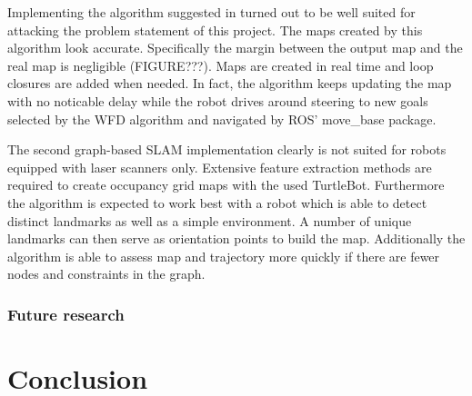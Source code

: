 \documentclass{ba-kecs}
\begin{document}
Implementing the algorithm suggested in \citep{Grisetti} turned out to be well suited for attacking the problem statement of this project. The maps created by this algorithm look accurate. Specifically the margin between the output map and the real map is negligible (FIGURE???). Maps are created in real time and loop closures are added when needed. In fact, the algorithm keeps updating the map with no noticable delay while the robot drives around steering to new goals selected by the WFD algorithm and navigated by ROS' move\_base package.

The second graph-based SLAM implementation \cite{Thrun} clearly is not suited for robots equipped with laser scanners only. Extensive feature extraction methods are required to create occupancy grid maps with the used TurtleBot. Furthermore the algorithm is expected to work best with a robot which is able to detect distinct landmarks as well as a simple environment. A number of unique landmarks can then serve as orientation points to build the map. Additionally the algorithm is able to assess map and trajectory more quickly if there are fewer nodes and constraints in the graph.

\subsubsection{Future research}

\section{Conclusion}
\label{sec:conc}

\nocite{*}
\onecolumn
\appendix
\end{document}

